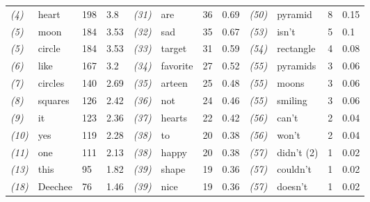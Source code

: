 \begin{screenonly}
\begin{table*}[h]
\begin{tabular*}{\hsize}{@{\extracolsep{\fill}}llllllllllll}
    \textsl{(4)} & heart & 198 & 3.8 & \hspace*{2ex}\textsl{(31)} & are & 36 & 0.69 & \hspace*{2ex}\textsl{(50)} & pyramid & 8 & 0.15\\
    \textsl{(5)} & moon & 184 & 3.53 & \hspace*{2ex}\textsl{(32)} & sad & 35 & 0.67 & \hspace*{2ex}\textsl{(53)} & isn't & 5 & 0.1\\
    \textsl{(5)} & circle & 184 & 3.53 & \hspace*{2ex}\textsl{(33)} & target & 31 & 0.59 & \hspace*{2ex}\textsl{(54)} & rectangle & 4 & 0.08\\
    \textsl{(6)} & like & 167 & 3.2 & \hspace*{2ex}\textsl{(34)} & favorite & 27 & 0.52 & \hspace*{2ex}\textsl{(55)} & pyramids & 3 & 0.06\\
    \textsl{(7)} & circles & 140 & 2.69 & \hspace*{2ex}\textsl{(35)} & arteen & 25 & 0.48 & \hspace*{2ex}\textsl{(55)} & moons & 3 & 0.06\\
    \textsl{(8)} & squares & 126 & 2.42 & \hspace*{2ex}\textsl{(36)} & not & 24 & 0.46 & \hspace*{2ex}\textsl{(55)} & smiling & 3 & 0.06\\
    \textsl{(9)} & it & 123 & 2.36 & \hspace*{2ex}\textsl{(37)} & hearts & 22 & 0.42 & \hspace*{2ex}\textsl{(56)} & can't & 2 & 0.04\\
    \textsl{(10)} & yes & 119 & 2.28 & \hspace*{2ex}\textsl{(38)} & to & 20 & 0.38 & \hspace*{2ex}\textsl{(56)} & won't & 2 & 0.04\\
    \textsl{(11)} & one & 111 & 2.13 & \hspace*{2ex}\textsl{(38)} & happy & 20 & 0.38 & \hspace*{2ex}\textsl{(57)} & didn't (2) & 1 & 0.02\\
    \textsl{(13)} & this & 95 & 1.82 & \hspace*{2ex}\textsl{(39)} & shape & 19 & 0.36 & \hspace*{2ex}\textsl{(57)} & couldn't & 1 & 0.02\\
    \textsl{(18)} & Deechee & 76 & 1.46 & \hspace*{2ex}\textsl{(39)} & nice & 19 & 0.36 & \hspace*{2ex}\textsl{(57)} & doesn't & 1 & 0.02\\

\end{tabular*}
\end{table*}
\end{screenonly}
